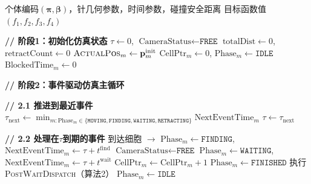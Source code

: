 \documentclass[11pt,a4paper]{article}
\begin{document}
\begin{algorithm}[H]
\caption{适应度评估 (EvaluateIndividual) —— v8.0版}
\begin{algorithmic}[1]
\Require 个体编码$(\boldsymbol{\pi}, \boldsymbol{\beta})$，针几何参数，时间参数，碰撞安全距离
\Ensure 目标函数值$(f_1, f_2, f_3, f_4)$

\State \textbf{// 阶段1：初始化仿真状态}
\State $\tau \leftarrow 0$, \; $\text{CameraStatus} \leftarrow \texttt{FREE}$
\State $\text{totalDist} \leftarrow 0$, \; $\text{retractCount} \leftarrow 0$
    \State $\textsc{ActualPos}_m \leftarrow \mathbf{p}_m^{\text{init}}$
    \State $\text{CellPtr}_m \leftarrow 0$, \; $\text{Phase}_m \leftarrow \texttt{IDLE}$
    \State $\text{BlockedTime}_m \leftarrow 0$
\EndFor

\State \textbf{// 阶段2：事件驱动仿真主循环}
    
    \State \textbf{// 2.1 推进到最近事件}
    \State $\tau_{\text{next}} \leftarrow \min_{m: \text{Phase}_m \in \{\texttt{MOVING}, \texttt{FINDING}, \texttt{WAITING}, \texttt{RETRACTING}\}} \text{NextEventTime}_m$
    \State $\tau \leftarrow \tau_{\text{next}}$
    
    \State \textbf{// 2.2 处理在$\tau$到期的事件}
            \State 到达细胞 $\rightarrow$ $\text{Phase}_m \leftarrow \texttt{FINDING}$, \; $\text{NextEventTime}_m \leftarrow \tau + t^{\text{find}}$
            \State $\text{CameraStatus} \leftarrow \texttt{FREE}$
            \State $\text{Phase}_m \leftarrow \texttt{WAITING}$, \; $\text{NextEventTime}_m \leftarrow \tau + t^{\text{wait}}$
            \State $\text{CellPtr}_m \leftarrow \text{CellPtr}_m + 1$
                \State $\text{Phase}_m \leftarrow \texttt{FINISHED}$
            \Else
                \State 执行 \textsc{PostWaitDispatch}（算法2） 
            \EndIf
            \State $\text{Phase}_m \leftarrow \texttt{IDLE}$ 
        \EndIf
    \EndFor
    

\end{algorithmic}
\end{algorithm}
\end{document}
